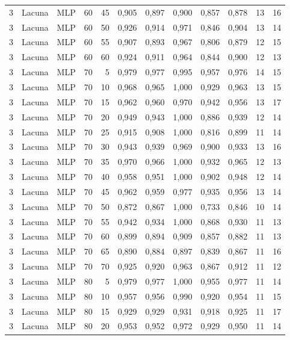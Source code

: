 \begin{longtable}{ccclrrrrrrrr}
3 & Lacuna & MLP & 60 & 45 & 0,905 & 0,897 & 0,900 & 0,857 & 0,878 & 13 & 16 \\
3 & Lacuna & MLP & 60 & 50 & 0,926 & 0,914 & 0,971 & 0,846 & 0,904 & 13 & 14 \\
3 & Lacuna & MLP & 60 & 55 & 0,907 & 0,893 & 0,967 & 0,806 & 0,879 & 12 & 15 \\
3 & Lacuna & MLP & 60 & 60 & 0,924 & 0,911 & 0,964 & 0,844 & 0,900 & 12 & 13 \\
3 & Lacuna & MLP & 70 & 5 & 0,979 & 0,977 & 0,995 & 0,957 & 0,976 & 14 & 15 \\
3 & Lacuna & MLP & 70 & 10 & 0,968 & 0,965 & 1,000 & 0,929 & 0,963 & 13 & 15 \\
3 & Lacuna & MLP & 70 & 15 & 0,962 & 0,960 & 0,970 & 0,942 & 0,956 & 13 & 17 \\
3 & Lacuna & MLP & 70 & 20 & 0,949 & 0,943 & 1,000 & 0,886 & 0,939 & 12 & 14 \\
3 & Lacuna & MLP & 70 & 25 & 0,915 & 0,908 & 1,000 & 0,816 & 0,899 & 11 & 14 \\
3 & Lacuna & MLP & 70 & 30 & 0,943 & 0,939 & 0,969 & 0,900 & 0,933 & 13 & 16 \\
3 & Lacuna & MLP & 70 & 35 & 0,970 & 0,966 & 1,000 & 0,932 & 0,965 & 12 & 13 \\
3 & Lacuna & MLP & 70 & 40 & 0,958 & 0,951 & 1,000 & 0,902 & 0,948 & 12 & 14 \\
3 & Lacuna & MLP & 70 & 45 & 0,962 & 0,959 & 0,977 & 0,935 & 0,956 & 13 & 14 \\
3 & Lacuna & MLP & 70 & 50 & 0,872 & 0,867 & 1,000 & 0,733 & 0,846 & 10 & 14 \\
3 & Lacuna & MLP & 70 & 55 & 0,942 & 0,934 & 1,000 & 0,868 & 0,930 & 11 & 13 \\
3 & Lacuna & MLP & 70 & 60 & 0,899 & 0,894 & 0,909 & 0,857 & 0,882 & 11 & 13 \\
3 & Lacuna & MLP & 70 & 65 & 0,890 & 0,884 & 0,897 & 0,839 & 0,867 & 11 & 16 \\
3 & Lacuna & MLP & 70 & 70 & 0,925 & 0,920 & 0,963 & 0,867 & 0,912 & 11 & 12 \\
3 & Lacuna & MLP & 80 & 5 & 0,979 & 0,977 & 1,000 & 0,955 & 0,977 & 11 & 14 \\
3 & Lacuna & MLP & 80 & 10 & 0,957 & 0,956 & 0,990 & 0,920 & 0,954 & 11 & 15 \\
3 & Lacuna & MLP & 80 & 15 & 0,929 & 0,929 & 0,931 & 0,918 & 0,925 & 11 & 17 \\
3 & Lacuna & MLP & 80 & 20 & 0,953 & 0,952 & 0,972 & 0,929 & 0,950 & 11 & 14 \\

\end{longtable}
